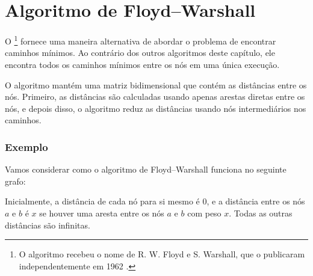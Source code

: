 \section{Algoritmo de Floyd–Warshall}


O \footnote{O algoritmo
recebeu o nome de R. W. Floyd e S. Warshall,
que o publicaram independentemente em 1962 \cite{flo62,war62}.}
fornece uma maneira alternativa de abordar o problema
de encontrar caminhos mínimos.
Ao contrário dos outros algoritmos deste capítulo,
ele encontra todos os caminhos mínimos entre os nós
em uma única execução.

O algoritmo mantém uma matriz bidimensional
que contém as distâncias entre os nós.
Primeiro, as distâncias são calculadas usando apenas
arestas diretas entre os nós,
e depois disso, o algoritmo reduz as distâncias
usando nós intermediários nos caminhos.

\subsubsection{Exemplo}

Vamos considerar como o algoritmo de Floyd–Warshall
funciona no seguinte grafo:

\begin{center}
\end{center}

Inicialmente, a distância de cada nó para si mesmo é $0$,
e a distância entre os nós $a$ e $b$ é $x$
se houver uma aresta entre os nós $a$ e $b$ com peso $x$.
Todas as outras distâncias são infinitas.

